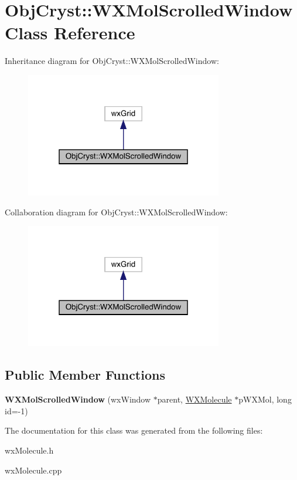 \hypertarget{class_obj_cryst_1_1_w_x_mol_scrolled_window}{}\section{Obj\+Cryst\+::W\+X\+Mol\+Scrolled\+Window Class Reference}
\label{class_obj_cryst_1_1_w_x_mol_scrolled_window}


Inheritance diagram for Obj\+Cryst\+::W\+X\+Mol\+Scrolled\+Window\+:
\nopagebreak
\begin{figure}[H]
\begin{center}
\leavevmode
\includegraphics[width=244pt]{class_obj_cryst_1_1_w_x_mol_scrolled_window__inherit__graph}
\end{center}
\end{figure}


Collaboration diagram for Obj\+Cryst\+::W\+X\+Mol\+Scrolled\+Window\+:
\nopagebreak
\begin{figure}[H]
\begin{center}
\leavevmode
\includegraphics[width=244pt]{class_obj_cryst_1_1_w_x_mol_scrolled_window__coll__graph}
\end{center}
\end{figure}
\subsection*{Public Member Functions}
\begin{DoxyCompactItemize}
\item 
\mbox{\label{class_obj_cryst_1_1_w_x_mol_scrolled_window_af76586c21801a1774e3098ae4bd1078a}} 
{\bfseries W\+X\+Mol\+Scrolled\+Window} (wx\+Window $\ast$parent, \mbox{\hyperlink{class_obj_cryst_1_1_w_x_molecule}{W\+X\+Molecule}} $\ast$p\+W\+X\+Mol, long id=-\/1)
\end{DoxyCompactItemize}


The documentation for this class was generated from the following files\+:\begin{DoxyCompactItemize}
\item 
wx\+Molecule.\+h\item 
wx\+Molecule.\+cpp\end{DoxyCompactItemize}
